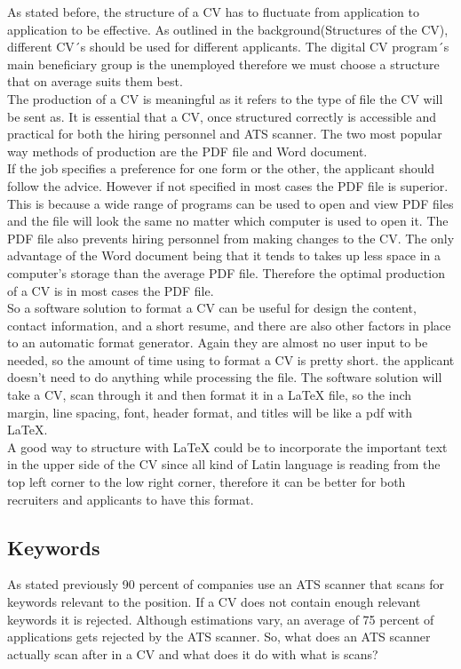 As stated before, the structure of a CV has to fluctuate from application to application to be effective.
As outlined in the background(Structures of the CV), different CV´s should be used for different applicants.
The digital CV program´s main beneficiary group is the unemployed therefore we must choose a structure that on average suits them best. \\

The production of a CV is meaningful as it refers to the type of file the CV will be sent as.
It is essential that a CV, once structured correctly is accessible and practical for both the hiring personnel and ATS scanner.
The two most popular way methods of production are the PDF file and Word document. \\

If the job specifies a preference for one form or the other, the applicant should follow the advice.
However if not specified in most cases the PDF file is superior.
This is because a wide range of programs can be used to open and view PDF files and the file will look the same no matter which computer is used to open it.
The PDF file also prevents hiring personnel from making changes to the CV. 
The only advantage of the Word document being that it tends to takes up less space in a computer's storage than the average PDF file.
Therefore the optimal production of a CV is in most cases the PDF file. \\

So a software solution to format a CV can be useful for design the content, contact information, and a short resume,
and there are also other factors in place to an automatic format generator. Again they are almost no user input to be needed, 
so the amount of time using to format a CV is pretty short. 
the applicant doesn't need to do anything while processing the file. The software solution will take a CV, scan through it and
then format it in a LaTeX file, so the inch margin, line spacing, font, header format, and titles will be like a pdf with LaTeX.\\

A good way to structure with LaTeX could be to incorporate the important text in the upper side of the CV 
since all kind of Latin language is reading from the top left corner to the low right corner, therefore it can be better
for both recruiters and applicants to have this format\cite{Pdf_vs_word}.\\

\subsection{Keywords}
As stated previously 90 percent of companies use an ATS scanner that scans for keywords relevant to the position.
If a CV does not contain enough relevant keywords it is rejected. 
Although estimations vary, an average of 75 percent of applications gets rejected by the ATS scanner.
So, what does an ATS scanner actually scan after in a CV and what does it do with what is scans? \\

